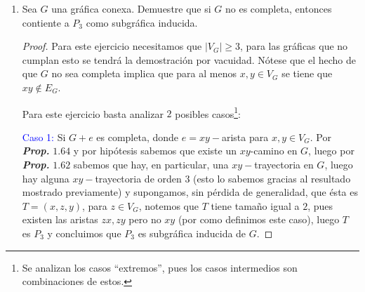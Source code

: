 \documentclass{article}
\begin{document}
\begin{enumerate}
\item {} Sea $G$ una gr\'afica conexa. Demuestre
  que si $G$ no es completa, entonces contiente a $P_3$ como subgr\'afica inducida.
    \renewcommand\qedsymbol{QED}
  \begin{proof} Para este ejercicio necesitamos que $|V_G| \geq 3$, para las
    gr\'aficas que no cumplan esto se tendr\'a la demostraci\'on por vacuidad.
    Nótese que el hecho de que $G$ no sea completa implica que para al
    menos $x,y \in V_G$ se tiene que $xy \notin E_G$.

        \begin{center}
    \end{center}
    
    Para este ejercicio basta analizar $2$ posibles casos\footnote{Se
      analizan los casos ``extremos'', pues los casos intermedios son combinaciones
      de estos.}:
    
    \textcolor{blue}{Caso 1:} Si $G + e$ es completa, donde $e = xy-$arista para
    $x,y \in V_G$. Por \textbf{\textit{Prop.}} $\mathbf{1.64}$ y por hipótesis
    sabemos que existe un $xy$-camino en $G$, luego por \textbf{\textit{Prop.}}
    $\mathbf{1.62}$ sabemos que hay, en particular, una $xy-$trayectoria en $G$,
    luego hay alguna $xy-$trayectoria de orden $3$ (esto lo sabemos gracias al
    resultado mostrado previamente) y supongamos, sin p\'erdida de generalidad,
    que \'esta es $T = (x,z,y)$, para $z \in V_G$, notemos que $T$ tiene tamaño
    igual a $2$, pues existen las aristas $zx, zy$ pero no $xy$ (por como definimos
    este caso), luego $T$ es $P_3$ y concluimos que $P_3$ es subgr\'afica inducida
    de $G$.
    

\end{proof}
\end{enumerate}
\end{document}
